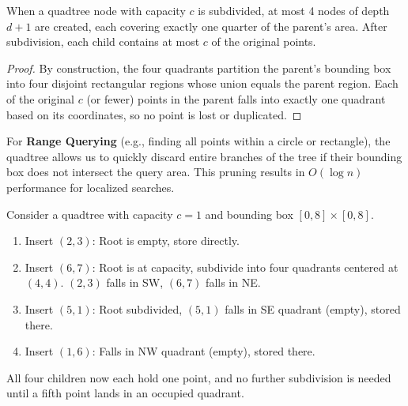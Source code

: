 \begin{theorem}
\label{thm:qt_subdivision}
When a quadtree node with capacity $c$ is subdivided, at most 4 nodes of depth $d+1$ are created, each covering exactly one quarter of the parent's area. After subdivision, each child contains at most $c$ of the original points.
\end{theorem}
\begin{proof}
By construction, the four quadrants partition the parent's bounding box into four disjoint rectangular regions whose union equals the parent region. Each of the original $c$ (or fewer) points in the parent falls into exactly one quadrant based on its coordinates, so no point is lost or duplicated.
\end{proof}

For \textbf{Range Querying} (e.g., finding all points within a circle or rectangle), the quadtree allows us to quickly discard entire branches of the tree if their bounding box does not intersect the query area. This pruning results in $O(\log n)$ performance for localized searches.

\begin{example}
\label{ex:qt_insert}
Consider a quadtree with capacity $c=1$ and bounding box $[0,8] \times [0,8]$.
\begin{enumerate}
    \item Insert $(2,3)$: Root is empty, store directly.
    \item Insert $(6,7)$: Root is at capacity, subdivide into four quadrants centered at $(4,4)$.  $(2,3)$ falls in SW, $(6,7)$ falls in NE.
    \item Insert $(5,1)$: Root subdivided, $(5,1)$ falls in SE quadrant (empty), stored there.
    \item Insert $(1,6)$: Falls in NW quadrant (empty), stored there.
\end{enumerate}
All four children now each hold one point, and no further subdivision is needed until a fifth point lands in an occupied quadrant.
\end{example}



